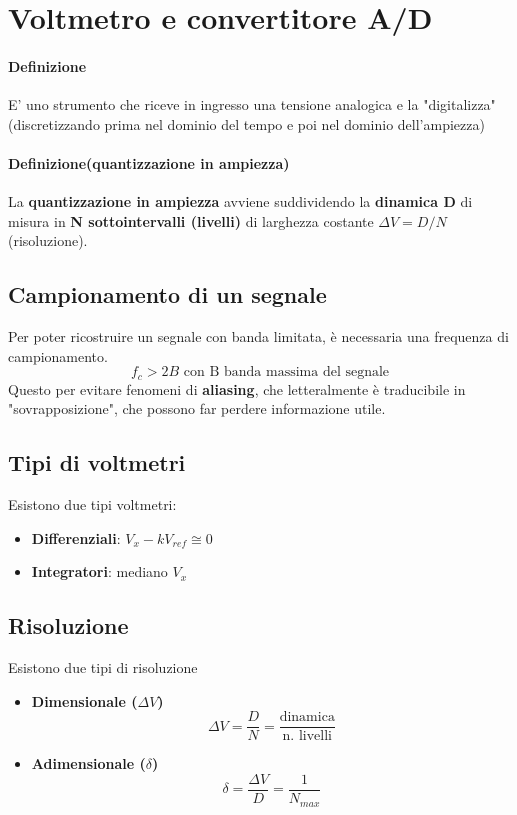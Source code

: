 \documentclass{article}
\begin{document}
	\newpage
	\section*{Voltmetro e convertitore A/D}
	\paragraph*{Definizione}
	E' uno strumento che riceve in ingresso una tensione analogica e la "digitalizza" (discretizzando prima nel dominio del tempo e poi nel dominio dell'ampiezza)
	\paragraph*{Definizione(quantizzazione in ampiezza)}
	La \textbf{quantizzazione in ampiezza} avviene suddividendo la \textbf{dinamica D} di misura in \textbf{N sottointervalli (livelli)} di larghezza costante $\Delta V = D/N$ (risoluzione). 
	\subsection*{Campionamento di un segnale}
	Per poter ricostruire un segnale con banda limitata, è necessaria una frequenza di campionamento.
	\begin{equation}
		f_c > 2B \text{    con B banda massima del segnale}
	\end{equation}
	Questo per evitare fenomeni di \textbf{aliasing}, che letteralmente è traducibile in "sovrapposizione", che possono far perdere informazione utile.
	\subsection*{Tipi di voltmetri}
	Esistono due tipi voltmetri:
	\begin{itemize}
		\item \textbf{Differenziali}: $V_x - kV_{ref} \cong 0$
		\item \textbf{Integratori}: mediano $V_x$
	\end{itemize}
	\subsection*{Risoluzione}
	Esistono due tipi di risoluzione
	\begin{itemize}
		\item \textbf{Dimensionale ($\Delta V$)}\\
			\begin{equation}
				\Delta V = \frac{D}{N} = \frac{\text{dinamica}}{\text{n. livelli}}
			\end{equation}
		\item \textbf{Adimensionale ($\delta$)}\\
			\begin{equation}
			\delta = \frac{\Delta V}{D} = \frac{1}{N_{max}}
			\end{equation}
	\end{itemize}
\end{document}
